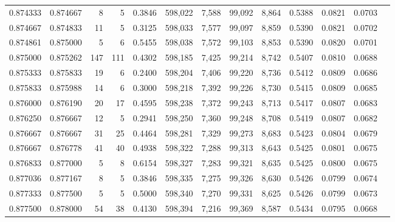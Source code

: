 \begin{tabular}{rrrrrrrrrrrrr}
0.874333 & 0.874667 &     8 &   5 &                                     0.3846 & 598,022 &   7,588 &  99,092 &   8,864 & 0.5388 & 0.0821 & 0.0703 \\
0.874667 & 0.874833 &    11 &   5 &                                     0.3125 & 598,033 &   7,577 &  99,097 &   8,859 & 0.5390 & 0.0821 & 0.0702 \\
0.874861 & 0.875000 &     5 &   6 &                                     0.5455 & 598,038 &   7,572 &  99,103 &   8,853 & 0.5390 & 0.0820 & 0.0701 \\
0.875000 & 0.875262 &   147 & 111 &                                     0.4302 & 598,185 &   7,425 &  99,214 &   8,742 & 0.5407 & 0.0810 & 0.0688 \\
0.875333 & 0.875833 &    19 &   6 &                                     0.2400 & 598,204 &   7,406 &  99,220 &   8,736 & 0.5412 & 0.0809 & 0.0686 \\
0.875833 & 0.875988 &    14 &   6 &                                     0.3000 & 598,218 &   7,392 &  99,226 &   8,730 & 0.5415 & 0.0809 & 0.0685 \\
0.876000 & 0.876190 &    20 &  17 &                                     0.4595 & 598,238 &   7,372 &  99,243 &   8,713 & 0.5417 & 0.0807 & 0.0683 \\
0.876250 & 0.876667 &    12 &   5 &                                     0.2941 & 598,250 &   7,360 &  99,248 &   8,708 & 0.5419 & 0.0807 & 0.0682 \\
0.876667 & 0.876667 &    31 &  25 &                                     0.4464 & 598,281 &   7,329 &  99,273 &   8,683 & 0.5423 & 0.0804 & 0.0679 \\
0.876667 & 0.876778 &    41 &  40 &                                     0.4938 & 598,322 &   7,288 &  99,313 &   8,643 & 0.5425 & 0.0801 & 0.0675 \\
0.876833 & 0.877000 &     5 &   8 &                                     0.6154 & 598,327 &   7,283 &  99,321 &   8,635 & 0.5425 & 0.0800 & 0.0675 \\
0.877036 & 0.877167 &     8 &   5 &                                     0.3846 & 598,335 &   7,275 &  99,326 &   8,630 & 0.5426 & 0.0799 & 0.0674 \\
0.877333 & 0.877500 &     5 &   5 &                                     0.5000 & 598,340 &   7,270 &  99,331 &   8,625 & 0.5426 & 0.0799 & 0.0673 \\
0.877500 & 0.878000 &    54 &  38 &                                     0.4130 & 598,394 &   7,216 &  99,369 &   8,587 & 0.5434 & 0.0795 & 0.0668 \\

\end{tabular}
